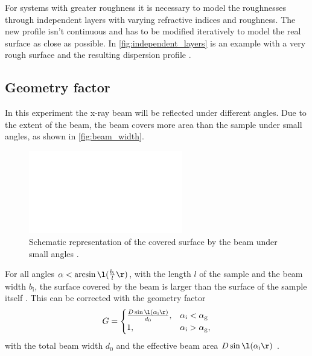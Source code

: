 For systems with greater roughness it is necessary to model the roughnesses through independent layers with varying refractive indices and roughness.
The new profile isn't continuous and has to be modified iteratively to model the real surface as close as possible.
In \autoref{fig:independent_layers} is an example with a very rough surface and the resulting dispersion profile \cite[28]{V44:xrr_tolan}.

\subsection{Geometry factor}
In this experiment the x-ray beam will be reflected under different angles.
Due to the extent of the beam, the beam covers more area than the sample under small angles, as shown in \autoref{fig:beam_width}.
\begin{figure}
    \centering
    \includegraphics[width=0.6\textwidth]{images/beam_width.pdf}
    \caption{Schematic representation of the covered surface by the beam under small angles \cite{V44}.}
    \label{fig:beam_width}
\end{figure}
For all angles $\alpha < \arcsin\l(\frac{b_\text{i}}{l}\r)$, with the length $l$ of the sample and the beam width $b_\text{i}$, the surface covered by the beam is larger than the surface of the sample itself \cite[41--42]{V44:xrr_tolan}\cite{V44:parratt}.
This can be corrected with the geometry factor
\begin{equation}\label{eqn:geometry_factor}
    G =
    \begin{cases}
        \frac{D\sin\l(\alpha_\text{i}\r)}{d_0}, &\alpha_\text{i}<\alpha_\text{g}\\
        1, &\alpha_\text{i}>\alpha_\text{g},
    \end{cases}
\end{equation}
with the total beam width $d_0$ and the effective beam area $D\sin\l(\alpha_\text{i}\r)$ \cite{V44}.